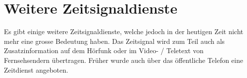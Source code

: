 

\section{Weitere Zeitsignaldienste}
Es gibt einige weitere Zeitsignaldienste, welche jedoch in der heutigen Zeit nicht mehr eine grosse Bedeutung haben. Das Zeitsignal wird zum Teil auch als Zusatzinformation auf dem Hörfunk oder im Video- / Teletext von Fernsehsendern übertragen. Früher wurde auch über das öffentliche Telefon eine Zeitdienst angeboten.



